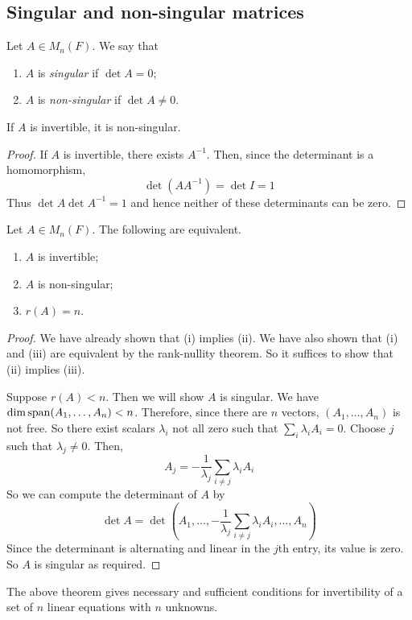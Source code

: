\subsection{Singular and non-singular matrices}
\begin{definition}
	Let \( A \in M_n(F) \).
	We say that
	\begin{enumerate}
		\item \( A \) is \textit{singular} if \( \det A = 0 \);
		\item \( A \) is \textit{non-singular} if \( \det A \neq 0 \).
	\end{enumerate}
\end{definition}
\begin{lemma}
	If \( A \) is invertible, it is non-singular.
\end{lemma}
\begin{proof}
	If \( A \) is invertible, there exists \( A^{-1} \).
	Then, since the determinant is a homomorphism,
	\[
		\det(A A^{-1}) = \det I = 1
	\]
	Thus \( \det A \det A^{-1} = 1 \) and hence neither of these determinants can be zero.
\end{proof}
\begin{theorem}
	Let \( A \in M_n(F) \).
	The following are equivalent.
	\begin{enumerate}
		\item \( A \) is invertible;
		\item \( A \) is non-singular;
		\item \( r(A) = n \).
	\end{enumerate}
\end{theorem}
\begin{proof}
	We have already shown that (i) implies (ii).
	We have also shown that (i) and (iii) are equivalent by the rank-nullity theorem.
	So it suffices to show that (ii) implies (iii).

	Suppose \( r(A) < n \).
	Then we will show \( A \) is singular.
	We have \( \dim \operatorname{span}(A_1, \dots, A_n) < n \).
	Therefore, since there are \( n \) vectors, \( (A_1, \dots, A_n) \) is not free.
	So there exist scalars \( \lambda_i \) not all zero such that \( \sum_i \lambda_i A_i = 0 \).
	Choose \( j \) such that \( \lambda_j \neq 0 \).
	Then,
	\[
		A_j = -\frac{1}{\lambda_j} \sum_{i \neq j} \lambda_i A_i
	\]
	So we can compute the determinant of \( A \) by
	\[
		\det A = \det(A_1, \dots, -\frac{1}{\lambda_j} \sum_{i \neq j} \lambda_i A_i, \dots, A_n)
	\]
	Since the determinant is alternating and linear in the \( j \)th entry, its value is zero.
	So \( A \) is singular as required.
\end{proof}
\begin{remark}
	The above theorem gives necessary and sufficient conditions for invertibility of a set of \( n \) linear equations with \( n \) unknowns.
\end{remark}

